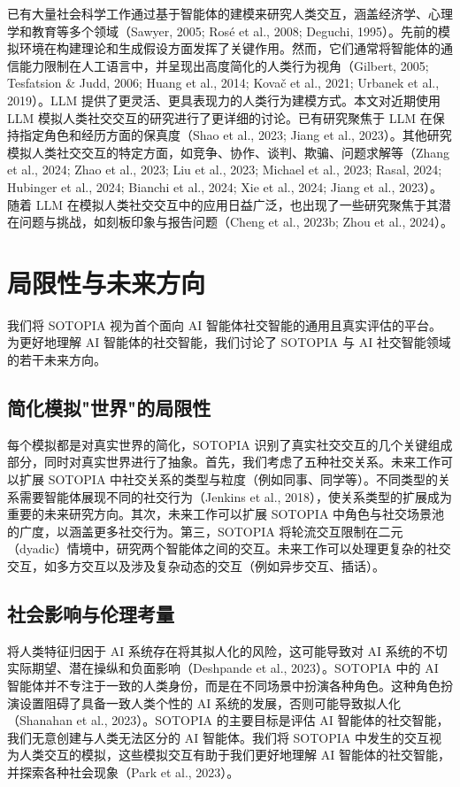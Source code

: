 \documentclass[11pt,a4paper]{article}
\begin{document}
已有大量社会科学工作通过基于智能体的建模来研究人类交互，涵盖经济学、心理学和教育等多个领域（Sawyer, 2005; Rosé et al., 2008; Deguchi, 1995）。先前的模拟环境在构建理论和生成假设方面发挥了关键作用。然而，它们通常将智能体的通信能力限制在人工语言中，并呈现出高度简化的人类行为视角（Gilbert, 2005; Tesfatsion \& Judd, 2006; Huang et al., 2014; Kovač et al., 2021; Urbanek et al., 2019）。LLM 提供了更灵活、更具表现力的人类行为建模方式。本文对近期使用 LLM 模拟人类社交交互的研究进行了更详细的讨论。已有研究聚焦于 LLM 在保持指定角色和经历方面的保真度（Shao et al., 2023; Jiang et al., 2023）。其他研究模拟人类社交交互的特定方面，如竞争、协作、谈判、欺骗、问题求解等（Zhang et al., 2024; Zhao et al., 2023; Liu et al., 2023; Michael et al., 2023; Rasal, 2024; Hubinger et al., 2024; Bianchi et al., 2024; Xie et al., 2024; Jiang et al., 2023）。随着 LLM 在模拟人类社交交互中的应用日益广泛，也出现了一些研究聚焦于其潜在问题与挑战，如刻板印象与报告问题（Cheng et al., 2023b; Zhou et al., 2024）。

\section{局限性与未来方向}
\label{app:limitation}

我们将 SOTOPIA 视为首个面向 AI 智能体社交智能的通用且真实评估的平台。为更好地理解 AI 智能体的社交智能，我们讨论了 SOTOPIA 与 AI 社交智能领域的若干未来方向。

\subsection*{简化模拟"世界"的局限性}

每个模拟都是对真实世界的简化，SOTOPIA 识别了真实社交交互的几个关键组成部分，同时对真实世界进行了抽象。首先，我们考虑了五种社交关系。未来工作可以扩展 SOTOPIA 中社交关系的类型与粒度（例如同事、同学等）。不同类型的关系需要智能体展现不同的社交行为（Jenkins et al., 2018），使关系类型的扩展成为重要的未来研究方向。其次，未来工作可以扩展 SOTOPIA 中角色与社交场景池的广度，以涵盖更多社交行为。第三，SOTOPIA 将轮流交互限制在二元（dyadic）情境中，研究两个智能体之间的交互。未来工作可以处理更复杂的社交交互，如多方交互以及涉及复杂动态的交互（例如异步交互、插话）。

\subsection*{社会影响与伦理考量}

将人类特征归因于 AI 系统存在将其拟人化的风险，这可能导致对 AI 系统的不切实际期望、潜在操纵和负面影响（Deshpande et al., 2023）。SOTOPIA 中的 AI 智能体并不专注于一致的人类身份，而是在不同场景中扮演各种角色。这种角色扮演设置阻碍了具备一致人类个性的 AI 系统的发展，否则可能导致拟人化（Shanahan et al., 2023）。SOTOPIA 的主要目标是评估 AI 智能体的社交智能，我们无意创建与人类无法区分的 AI 智能体。我们将 SOTOPIA 中发生的交互视为人类交互的模拟，这些模拟交互有助于我们更好地理解 AI 智能体的社交智能，并探索各种社会现象（Park et al., 2023）。
\end{document}
